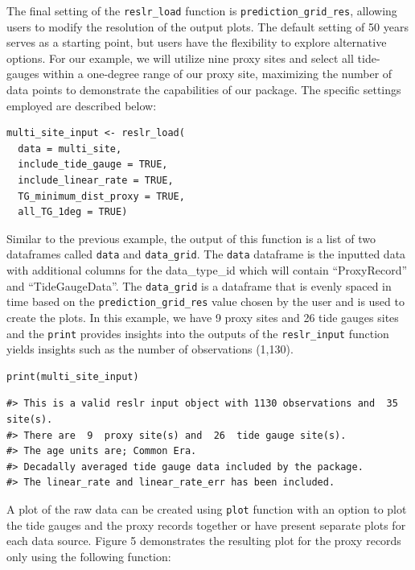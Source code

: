 The final setting of the \texttt{reslr\_load} function is \texttt{prediction\_grid\_res}, allowing users to modify the resolution of the output plots. The default setting of 50 years serves as a starting point, but users have the flexibility to explore alternative options. For our example, we will utilize nine proxy sites and select all tide-gauges within a one-degree range of our proxy site, maximizing the number of data points to demonstrate the capabilities of our package. The specific settings employed are described below:
\scriptsize

\begin{verbatim}
multi_site_input <- reslr_load(
  data = multi_site,
  include_tide_gauge = TRUE,
  include_linear_rate = TRUE,
  TG_minimum_dist_proxy = TRUE,
  all_TG_1deg = TRUE)
\end{verbatim}

\normalsize

Similar to the previous example, the output of this function is a list of two dataframes called \texttt{data} and \texttt{data\_grid}. The \texttt{data} dataframe is the inputted data with additional columns for the data\_type\_id which will contain ``ProxyRecord'' and ``TideGaugeData''. The \texttt{data\_grid} is a dataframe that is evenly spaced in time based on the \texttt{prediction\_grid\_res} value chosen by the user and is used to create the plots. In this example, we have 9 proxy sites and 26 tide gauges sites and the \texttt{print} provides insights into the outputs of the \texttt{reslr\_input} function yields insights such as the number of observations (1,130).
\scriptsize

\begin{verbatim}
print(multi_site_input)
\end{verbatim}

\begin{verbatim}
#> This is a valid reslr input object with 1130 observations and  35 site(s).
#> There are  9  proxy site(s) and  26  tide gauge site(s).
#> The age units are; Common Era. 
#> Decadally averaged tide gauge data included by the package. 
#> The linear_rate and linear_rate_err has been included.
\end{verbatim}

\normalsize

A plot of the raw data can be created using \texttt{plot} function with an option to plot the tide gauges and the proxy records together or have present separate plots for each data source. Figure 5 demonstrates the resulting plot for the proxy records only using the following function:
\scriptsize

